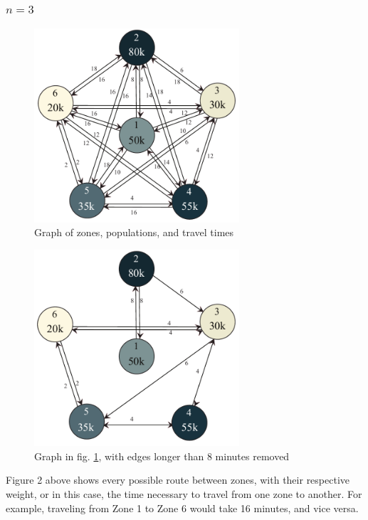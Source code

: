 \documentclass[notitlepage, 12pt]{article}
\begin{document}
\subsubsection{$n=3$}

\begin{figure}[htbp]
\label{fig:fullgraph}
\begin{center}
\includegraphics[width=3in]{6point.pdf}
\caption{Graph of zones, populations, and travel times}
\end{center}
\end{figure}

\begin{figure}[htbp]
\begin{center}
\includegraphics[width=3in]{greedy6point.pdf}
\caption{Graph in fig. \ref{fig:fullgraph}, with edges longer than 8 minutes removed}
\end{center}
\end{figure}

Figure 2 above shows every possible route between zones, with their respective weight, or in this case, the time necessary to travel from one zone to another. For example, traveling from Zone 1 to Zone 6 would take 16 minutes, and vice versa. 
\end{document}
